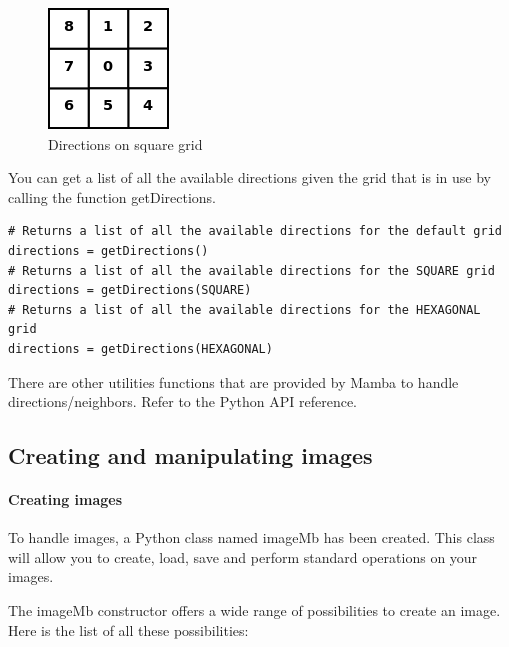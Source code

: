 \documentclass[a4paper,10pt,oneside]{article}
\begin{document}
\begin{figure}
\centering
\includegraphics[scale=0.4]{sqGriddir.png}
\caption{Directions on square grid}
\label{fig:sqgriddir}
\end{figure}

You can get a list of all the available directions given the grid that is in use
by calling the function getDirections.

\lstset{language=Python}
\begin{lstlisting}
# Returns a list of all the available directions for the default grid
directions = getDirections()
# Returns a list of all the available directions for the SQUARE grid
directions = getDirections(SQUARE)
# Returns a list of all the available directions for the HEXAGONAL grid
directions = getDirections(HEXAGONAL)
\end{lstlisting}

There are other utilities functions that are provided by Mamba to handle 
directions/neighbors. Refer to the Python API reference.

\subsection{Creating and manipulating images}
\label{cha:create_im}

\paragraph{Creating images}

To handle images, a Python class named imageMb has been created. This class will allow
you to create, load, save and perform standard operations on your images.

The imageMb constructor offers a wide range of possibilities to create an image. 
Here is the list of all these possibilities:
\end{document}
